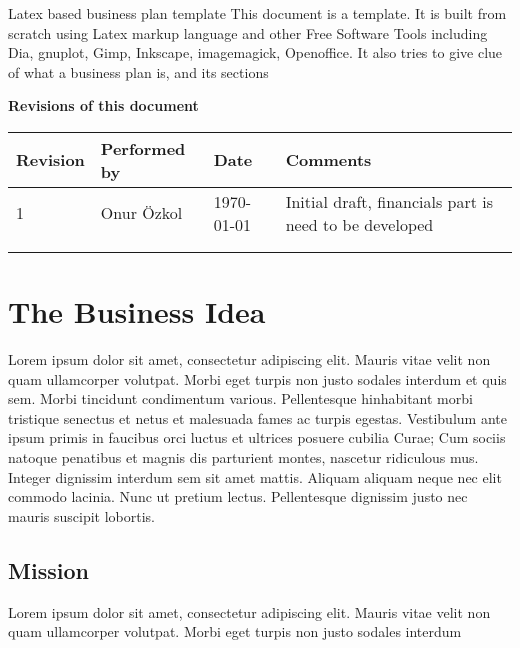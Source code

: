 \documentclass[11pt]{article}
\begin{document}
\begin{center}\huge{Latex based business plan template}\newline
\newline
\newline
\newline
\normalsize
This document is a template. It is built from scratch using Latex
markup language and other Free Software Tools including Dia, gnuplot, Gimp,
Inkscape, imagemagick, Openoffice.\newline
It also tries to give clue of what a business plan is, and its sections\newline
\end{center}
\thispagestyle{empty}
\newpage
\tableofcontents
\newpage
\thispagestyle{empty}
\textbf{Revisions of this document}\newline\newline\newline
\begin{tabular}{ | l | l | l | l |}\hline
  Revision & Performed by & Date & Comments \\ \hline
  1 & Onur \"Ozkol & \today & Initial draft, financials part is need to be developed\\ \hline
  & & &  \\ \hline
  & & &  \\ \hline
\end{tabular}

\section{The Business Idea}

Lorem ipsum dolor sit amet, consectetur adipiscing elit. Mauris vitae velit
non quam ullamcorper volutpat. Morbi eget turpis non justo sodales interdum
et quis sem. Morbi tincidunt condimentum various. Pellentesque hinhabitant morbi
tristique senectus et netus et malesuada fames ac turpis egestas. Vestibulum
ante ipsum primis in faucibus orci luctus et ultrices posuere cubilia Curae;
Cum sociis natoque penatibus et magnis dis parturient montes, nascetur
ridiculous mus. Integer dignissim interdum sem sit amet mattis.
Aliquam aliquam neque nec elit commodo lacinia. Nunc ut pretium lectus.
Pellentesque dignissim justo nec mauris suscipit lobortis.\newline


\subsection{Mission}
Lorem ipsum dolor sit amet, consectetur adipiscing elit. Mauris vitae velit
non quam ullamcorper volutpat. Morbi eget turpis non justo sodales interdum
\newline
\end{document}
